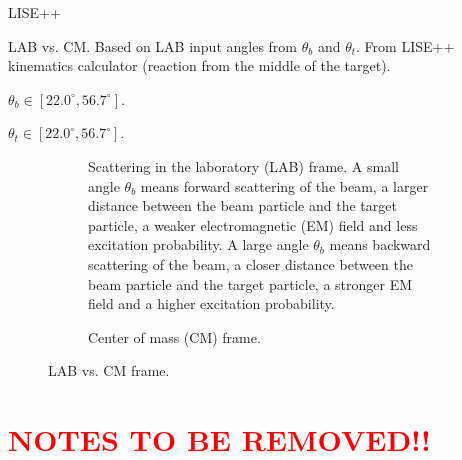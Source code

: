 \documentclass[twoside,english]{uiofysmaster/uiofysmaster}
\begin{document}
\bigskip


LISE++ \cite{LISE}

\begin{table}[ht] 
    \centering 
    \caption{LAB vs. CM. Based on LAB input angles from $\theta_b$ and $\theta_t$. From LISE++ kinematics calculator (reaction from the middle of the target).}
	\label{tab:LABvsCM}
    \begin{subtable}{0.45\textwidth}
    		\centering
		\caption{$\theta_b \in [22.0^\circ, 56.7^\circ]$.}
	 	\label{tab:LABvsCM_b}
	 	
	\end{subtable}
	\begin{subtable}{0.45\textwidth}
		\centering
		\caption{$\theta_t \in [22.0^\circ, 56.7^\circ]$.}
		\label{tab:LABvsCM_t}
		
	\end{subtable}
\end{table}


\begin{figure}[ht]
	\centering
	\begin{subfigure}{\textwidth}
		
		\caption{Scattering in the laboratory (LAB) frame. A small angle $\theta_b$ means forward scattering of the beam, a larger distance between the beam particle and the target particle, a weaker electromagnetic (EM) field and less excitation probability. A large angle $\theta_b$ means backward scattering of the beam, a closer distance between the beam particle and the target particle, a stronger EM field and a higher excitation probability.}
		\label{fig:LAB}
	\end{subfigure}
	\begin{subfigure}{\textwidth}
		
		\caption{Center of mass (CM) frame.}
		\label{fig:CM}
	\end{subfigure}
	\caption{LAB vs. CM frame.}
	\label{fig:LAB-CM}
\end{figure}

\newpage

\chapter*{\textcolor{red}{NOTES TO BE REMOVED!!}}
\end{document}
